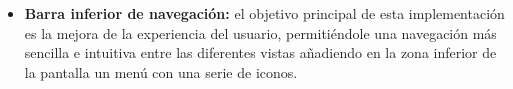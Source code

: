 \begin{itemize}
    
    \item \textbf{Barra inferior de navegación:} el objetivo principal de esta implementación es la mejora de la experiencia del usuario, permitiéndole una navegación más sencilla e intuitiva entre las diferentes vistas añadiendo en la zona inferior de la pantalla un menú con una serie de iconos.%
    
    

\end{itemize}
